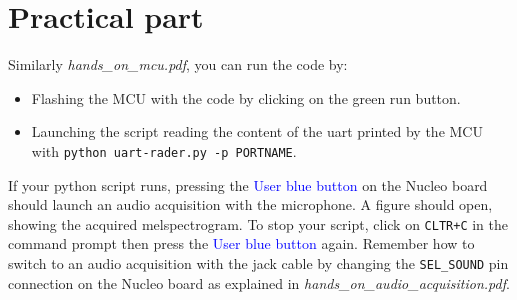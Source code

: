 \section{Practical part}
%
Similarly \emph{hands\_on\_mcu.pdf}, you can run the code by:
\begin{itemize}
	\item Flashing the MCU with the code by clicking on the green run button.
	\item Launching the script reading the content of the uart printed by the MCU with \texttt{python uart-rader.py -p PORTNAME}. 
\end{itemize}
If your python script runs, pressing the \textcolor{blue}{User blue button} on the Nucleo board should launch an audio acquisition with the microphone. A figure should open, showing the acquired melspectrogram. To stop your script, click on \texttt{CLTR+C} in the command prompt then press the \textcolor{blue}{User blue button} again.  Remember how to switch to an audio acquisition with the jack cable by changing the \texttt{SEL\_SOUND} pin connection on the Nucleo board as explained in \emph{hands\_on\_audio\_acquisition.pdf}. 
%

